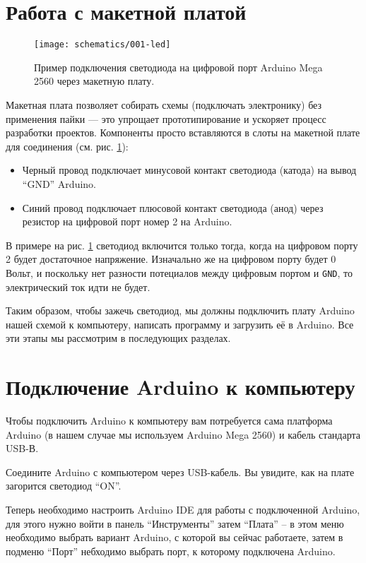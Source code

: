 \documentclass[../sparc.tex]{subfiles}
\begin{document}
\section{Работа с макетной платой}

\begin{figure}[ht]
  \centering
  \texttt{[image: schematics/001-led]}
  \caption{Пример подключения светодиода на цифровой порт Arduino Mega 2560
    через макетную плату.}
  \label{fig:breadboard-led}
\end{figure}

Макетная плата позволяет собирать схемы (подключать электронику) без применения
пайки --- это упрощает прототипирование и ускоряет процесс разработки проектов.
Компоненты просто вставляются в слоты на макетной плате для соединения
(см. рис. \ref{fig:breadboard-led}):

\begin{itemize}
\item Черный провод подключает минусовой контакт светодиода (катода) на вывод
  ``GND'' Arduino.
\item Синий провод подключает плюсовой контакт светодиода (анод) через резистор
  на цифровой порт номер 2 на Arduino.
\end{itemize}


В примере на рис. \ref{fig:breadboard-led} светодиод включится только тогда,
когда на цифровом порту 2 будет достаточное напряжение.  Изначально же на
цифровом порту будет 0 Вольт, и поскольку нет разности потециалов между цифровым
портом и \texttt{GND}, то электрический ток идти не будет.

Таким образом, чтобы зажечь светодиод, мы должны подключить плату Arduino нашей
схемой к компьютеру, написать программу и загрузить её в Arduino.  Все эти этапы
мы рассмотрим в последующих разделах.

\section{Подключение Arduino к компьютеру}
Чтобы подключить Arduino к компьютеру вам потребуется сама платформа Ardu\-ino
(в нашем случае мы используем Arduino Mega 2560) и кабель стандарта USB-В.

Соедините Arduino с компьютером через USB-кабель. Вы увидите, как на плате
загорится светодиод ``ON''.

Теперь необходимо настроить Arduino IDE для работы с подключенной Ardu\-ino, для
этого нужно войти в панель ``Инструменты'' затем ``Плата'' -- в этом меню
необходимо выбрать вариант Arduino, с которой вы сейчас работаете, затем в
подменю ``Порт'' небходимо выбрать порт, к которому подключена Arduino.
\end{document}
